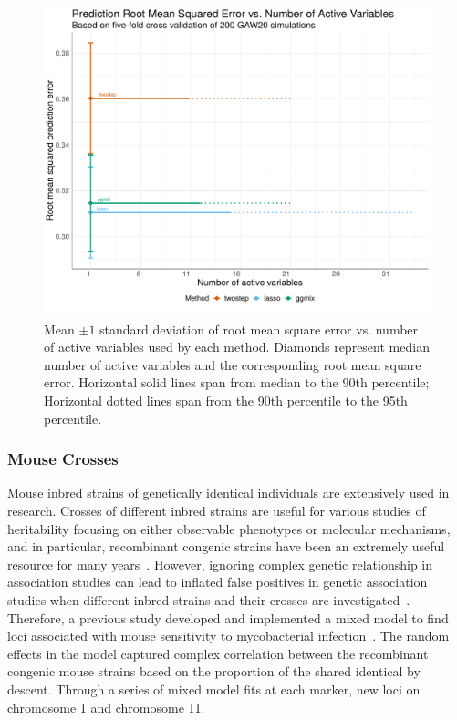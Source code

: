 \documentclass[12pt,letter]{article}\usepackage[]{graphicx}\usepackage[]{color}
\newenvironment{knitrout}{}{} %
\begin{document}
\begin{knitrout}\scriptsize
{}\color{fgcolor}\begin{figure}[H]

{\centering \includegraphics[width=1\linewidth]{figure/GAW20-prediction-RMSE-activeVariable-1} 

}

\caption[Mean $\pm 1$ standard deviation of root mean square error vs]{Mean $\pm 1$ standard deviation of root mean square error vs. number of active variables used by each method. Diamonds represent median number of active variables and the corresponding root mean square error. Horizontal solid lines span from median to the 90th percentile; Horizontal dotted lines span from the 90th percentile to the 95th percentile.}\label{fig:GAW20-prediction-RMSE-activeVariable}
\end{figure}


\end{knitrout}

\subsubsection{Mouse Crosses}

Mouse inbred strains of genetically identical individuals are extensively used in research.
Crosses of different inbred strains are useful for various studies of heritability focusing on either observable phenotypes or molecular mechanisms, and in particular, recombinant congenic strains have been an extremely useful resource for many years~\citep{fortin2001recombinant}.
However, ignoring complex genetic relationship in association studies can lead to inflated false positives in genetic association studies when different inbred strains and their crosses are investigated~\citep{bennett2010high,flint2012genome,cheng2010genome}.
Therefore, a previous study developed and implemented a mixed model to find loci associated with mouse sensitivity to mycobacterial infection~\citep{di2010strain}. The random effects in the model captured complex correlation between the recombinant congenic mouse strains based on the proportion of the shared identical by descent. Through a series of mixed model fits at each marker, new loci on chromosome 1 and chromosome 11.
\end{document}
